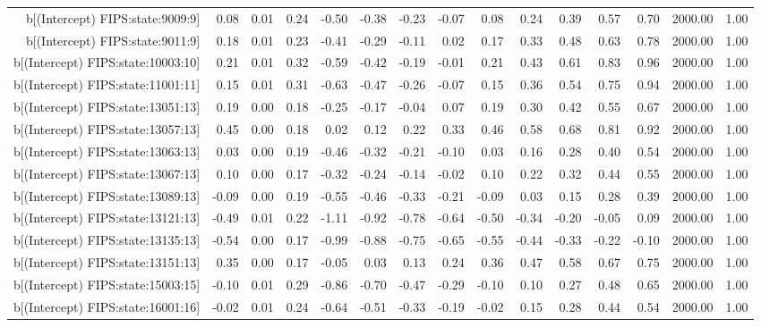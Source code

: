 \begin{table}[ht]
\begin{tabular}{rrrrrrrrrrrrrrr}
  b[(Intercept) FIPS:state:9009:9] & 0.08 & 0.01 & 0.24 & -0.50 & -0.38 & -0.23 & -0.07 & 0.08 & 0.24 & 0.39 & 0.57 & 0.70 & 2000.00 & 1.00 \\ 
  b[(Intercept) FIPS:state:9011:9] & 0.18 & 0.01 & 0.23 & -0.41 & -0.29 & -0.11 & 0.02 & 0.17 & 0.33 & 0.48 & 0.63 & 0.78 & 2000.00 & 1.00 \\ 
  b[(Intercept) FIPS:state:10003:10] & 0.21 & 0.01 & 0.32 & -0.59 & -0.42 & -0.19 & -0.01 & 0.21 & 0.43 & 0.61 & 0.83 & 0.96 & 2000.00 & 1.00 \\ 
  b[(Intercept) FIPS:state:11001:11] & 0.15 & 0.01 & 0.31 & -0.63 & -0.47 & -0.26 & -0.07 & 0.15 & 0.36 & 0.54 & 0.75 & 0.94 & 2000.00 & 1.00 \\ 
  b[(Intercept) FIPS:state:13051:13] & 0.19 & 0.00 & 0.18 & -0.25 & -0.17 & -0.04 & 0.07 & 0.19 & 0.30 & 0.42 & 0.55 & 0.67 & 2000.00 & 1.00 \\ 
  b[(Intercept) FIPS:state:13057:13] & 0.45 & 0.00 & 0.18 & 0.02 & 0.12 & 0.22 & 0.33 & 0.46 & 0.58 & 0.68 & 0.81 & 0.92 & 2000.00 & 1.00 \\ 
  b[(Intercept) FIPS:state:13063:13] & 0.03 & 0.00 & 0.19 & -0.46 & -0.32 & -0.21 & -0.10 & 0.03 & 0.16 & 0.28 & 0.40 & 0.54 & 2000.00 & 1.00 \\ 
  b[(Intercept) FIPS:state:13067:13] & 0.10 & 0.00 & 0.17 & -0.32 & -0.24 & -0.14 & -0.02 & 0.10 & 0.22 & 0.32 & 0.44 & 0.55 & 2000.00 & 1.00 \\ 
  b[(Intercept) FIPS:state:13089:13] & -0.09 & 0.00 & 0.19 & -0.55 & -0.46 & -0.33 & -0.21 & -0.09 & 0.03 & 0.15 & 0.28 & 0.39 & 2000.00 & 1.00 \\ 
  b[(Intercept) FIPS:state:13121:13] & -0.49 & 0.01 & 0.22 & -1.11 & -0.92 & -0.78 & -0.64 & -0.50 & -0.34 & -0.20 & -0.05 & 0.09 & 2000.00 & 1.00 \\ 
  b[(Intercept) FIPS:state:13135:13] & -0.54 & 0.00 & 0.17 & -0.99 & -0.88 & -0.75 & -0.65 & -0.55 & -0.44 & -0.33 & -0.22 & -0.10 & 2000.00 & 1.00 \\ 
  b[(Intercept) FIPS:state:13151:13] & 0.35 & 0.00 & 0.17 & -0.05 & 0.03 & 0.13 & 0.24 & 0.36 & 0.47 & 0.58 & 0.67 & 0.75 & 2000.00 & 1.00 \\ 
  b[(Intercept) FIPS:state:15003:15] & -0.10 & 0.01 & 0.29 & -0.86 & -0.70 & -0.47 & -0.29 & -0.10 & 0.10 & 0.27 & 0.48 & 0.65 & 2000.00 & 1.00 \\ 
  b[(Intercept) FIPS:state:16001:16] & -0.02 & 0.01 & 0.24 & -0.64 & -0.51 & -0.33 & -0.19 & -0.02 & 0.15 & 0.28 & 0.44 & 0.54 & 2000.00 & 1.00 \\ 

\end{tabular}
\end{table}
